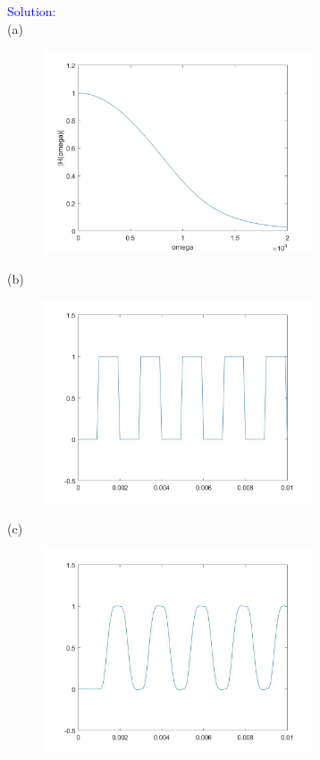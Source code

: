 \documentclass[12pt,a4paper]{article}
\begin{document}
\begin{tcolorbox}
\normalsize
\textcolor{blue}{Solution:}\\
(a)\begin{figure}[H]
    \centering
    \includegraphics[width=8cm]{6a.jpg}
\end{figure}
(b)\begin{figure}[H]
    \centering
    \includegraphics[width=8cm]{6b.jpg}
\end{figure}
(c)\begin{figure}[H]
    \centering
    \includegraphics[width=8cm]{6c.jpg}
\end{figure}
\end{tcolorbox}
\end{document}
